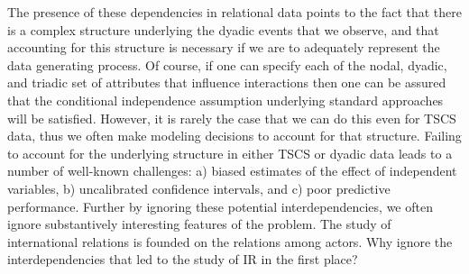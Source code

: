 The presence of these dependencies in relational data points to the fact that there is a complex structure underlying the dyadic events that we observe, and that accounting for this structure is necessary if we are to adequately represent the data generating process. Of course, if one can specify each of the nodal, dyadic, and triadic set of attributes that influence interactions then one can be assured that the conditional independence assumption underlying standard approaches will be satisfied. However, it is rarely the case that we can do this even for TSCS data, thus we often make modeling decisions to account for that structure. Failing to account for the underlying structure in either TSCS or dyadic data leads to a number of well-known challenges: a) biased estimates of the effect of independent variables, b) uncalibrated confidence intervals, and c) poor predictive performance. Further by ignoring these potential interdependencies, we often ignore substantively interesting features of the problem. The study of international relations is founded on the relations among actors. Why ignore the interdependencies that led to the study of IR in the first place?